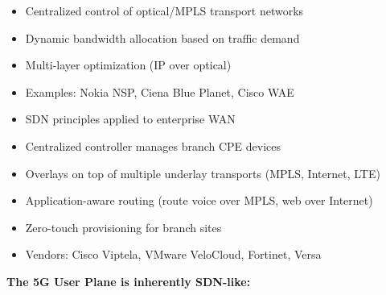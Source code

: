 




\CNchained{}

\begin{itemize}
\tightlist
\item
  Centralized control of optical/\allowbreak{}MPLS transport networks
\item
  Dynamic bandwidth allocation based on traffic demand
\item
  Multi-layer optimization (IP over optical)
\item
  Examples: Nokia NSP, Ciena Blue Planet, Cisco WAE
\end{itemize}


\begin{itemize}
\tightlist
\item
  SDN principles applied to enterprise WAN
\item
  Centralized controller manages branch CPE devices
\item
  Overlays on top of multiple underlay transports (MPLS, Internet, LTE)
\item
  Application-aware routing (route voice over MPLS, web over Internet)
\item
  Zero-touch provisioning for branch sites
\item
  Vendors: Cisco Viptela, VMware VeloCloud, Fortinet, Versa
\end{itemize}





\textbf{The 5G User Plane is inherently SDN-like:}

